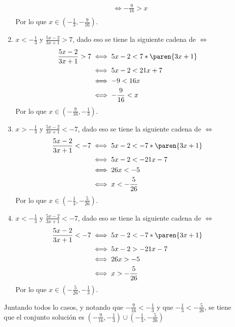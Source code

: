 \documentclass{ayudantia}
\begin{document}
\begin{ans}
\begin{sol}
\begin{enumerate}
\begin{enumerate}[label={Caso \arabic*:}]
\begin{align*}
                    &\iff -\frac9{16}>x\\
                \end{align*}
                Por lo que \(x\in(-\frac13,-\frac9{16})\).
                \item \(x<-\frac13\) y \(\frac{5x-2}{3x+1}>7\), dado eso se tiene la siguiente cadena de \(\iff\)
                \begin{align*}
                    \frac{5x-2}{3x+1}>7&\iff 5x-2<7*\paren{3x+1}\\
                    &\iff 5x-2<21x+7\\
                    &\iff -9<16x\\
                    &\iff -\frac9{16}<x\\
                \end{align*}
                Por lo que \(x\in(-\frac9{16},-\frac13)\).
                \item \(x>-\frac13\) y \(\frac{5x-2}{3x+1}<-7\), dado eso se tiene la siguiente cadena de \(\iff\)
                \begin{align*}
                    \frac{5x-2}{3x+1}<-7&\iff 5x-2<-7*\paren{3x+1}\\
                    &\iff 5x-2<-21x-7\\
                    &\iff 26x<-5\\
                    &\iff x<-\frac5{26}\\
                \end{align*}
                Por lo que \(x\in(-\frac13,-\frac5{26})\).
                \item \(x<-\frac13\) y \(\frac{5x-2}{3x+1}<-7\), dado eso se tiene la siguiente cadena de \(\iff\)
                \begin{align*}
                    \frac{5x-2}{3x+1}<-7&\iff 5x-2<-7*\paren{3x+1}\\
                    &\iff 5x-2>-21x-7\\
                    &\iff 26x>-5\\
                    &\iff x>-\frac5{26}\\
                \end{align*}
                Por lo que \(x\in(-\frac5{26},-\frac13)\).
            \end{enumerate}
            Juntando todos lo casos, y notando que \(-\frac9{16}<-\frac13\) y que \(-\frac13<-\frac5{26}\), se tiene que el conjunto solución es \((-\frac9{16},-\frac13)\cup (-\frac13,-\frac5{26})\)
        \end{enumerate}
    \end{sol}
\end{ans}
\end{document}
